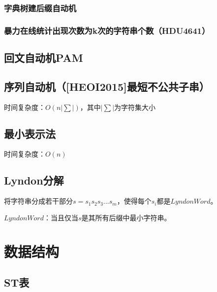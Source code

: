 \documentclass[landscape,twocolumn,twoside,a4paper]{article}
\begin{document}
\subsubsection{字典树建后缀自动机}


\subsubsection{暴力在线统计出现次数为k次的字符串个数（HDU4641）}





\subsection{回文自动机PAM}



\subsection{序列自动机（[HEOI2015]最短不公共子串）}
时间复杂度：$O(n|\sum|)$，其中$|\sum|$为字符集大小


\subsection{最小表示法}
时间复杂度：$O(n)$


\subsection{Lyndon分解}
将字符串分成若干部分$s = s_{1}s_{2}s_{3}...s_{m}$，使得每个$s_{i}$都是$Lyndon Word$。\par
$Lyndon Word$：当且仅当$s$是其所有后缀中最小字符串。



\section{数据结构}

\subsection{ST表}

\end{document}
